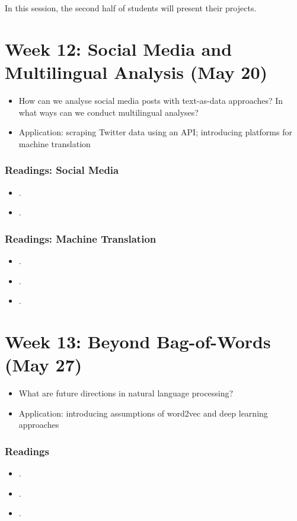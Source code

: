 \documentclass[abstract=on,parskip=full,headings=standardclasses,fontsize=11pt,paper=a4]{scrartcl}
\begin{document}
In this session, the second half of students will present their projects. 



\section{Week 12: Social Media and Multilingual Analysis (May 20)}

\begin{itemize}
\item How can we analyse social media posts with text-as-data approaches? In what ways can we conduct multilingual analyses? 
\item Application: scraping Twitter data using an API; introducing platforms for machine translation
\end{itemize}

\subsubsection*{Readings: Social Media}
\begin{itemize}
\item {}.
\item {}.
\end{itemize}

\subsubsection*{Readings: Machine Translation}
\begin{itemize}
\item {}.
\item {}.
\item {}.
\end{itemize}


\section{Week 13: Beyond Bag-of-Words (May 27)}


\begin{itemize}
\item What are future directions in natural language processing?
\item Application: introducing assumptions of word2vec and deep learning approaches
\end{itemize}

\subsubsection*{Readings}
\begin{itemize}
\item {}.
\item {}.
\item {}.
\end{itemize}
\end{document}
